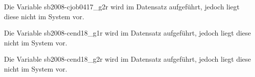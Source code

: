 \documentclass[a4paper]{article}
\begin{document}
				

				

				

				

				

				

				

				

				

				

				

				

				

				

				

				

				

				

				

				

				

				

		Die Variable sb2008-cjob0417\_g2r wird im Datensatz aufgeführt, jedoch liegt diese nicht im System vor.

				

				

				

				

				

				

				

		Die Variable sb2008-cend18\_g1r wird im Datensatz aufgeführt, jedoch liegt diese nicht im System vor.

		Die Variable sb2008-cend18\_g2r wird im Datensatz aufgeführt, jedoch liegt diese nicht im System vor.
\end{document}
